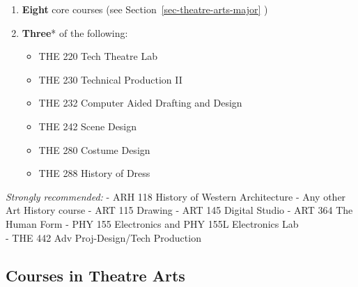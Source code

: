 \documentclass[
  letterpaper,
]{scrbook}
\providecommand{\tightlist}{%
  \setlength{\itemsep}{0pt}\setlength{\parskip}{0pt}}
\begin{document}
\begin{enumerate}
\def\labelenumi{\arabic{enumi}.}
\item
  \textbf{Eight} core courses (see Section~\ref{sec-theatre-arts-major}
  )
\item
  \textbf{Three}* of the following:

  \begin{itemize}
  \tightlist
  \item
    THE 220 Tech Theatre Lab
  \item
    THE 230 Technical Production II
  \item
    THE 232 Computer Aided Drafting and Design
  \item
    THE 242 Scene Design
  \item
    THE 280 Costume Design
  \item
    THE 288 History of Dress
  \end{itemize}
\end{enumerate}

\emph{Strongly recommended:} - ARH 118 History of Western Architecture -
Any other Art History course - ART 115 Drawing - ART 145 Digital Studio
- ART 364 The Human Form - PHY 155 Electronics and PHY 155L Electronics
Lab\\
- THE 442 Adv Proj-Design/Tech Production

\subsection{Courses in Theatre Arts}\label{sec-courses-in-theatre-arts}
\end{document}
